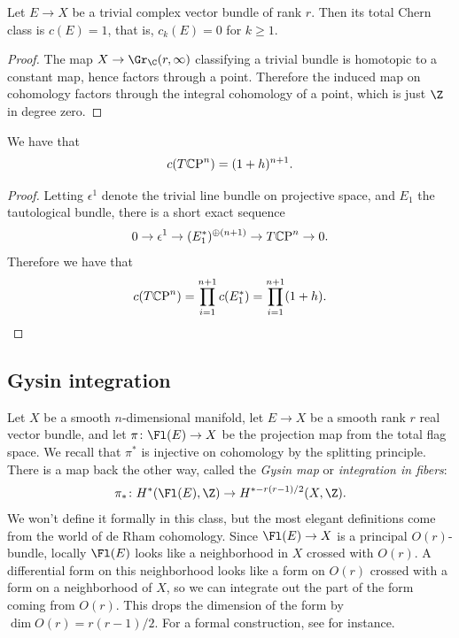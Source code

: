 \documentclass[11pt]{book}
\begin{document}
\begin{proposition}
Let $E \to X$ be a trivial complex vector bundle of rank $r$. Then its total Chern class is $c(E) =1$, that is, $c_k(E) = 0$ for $k\ge1$.
\end{proposition}
\begin{proof}
The map $X \to \Gr_\C(r,\infty)$ classifying a trivial bundle is homotopic to a constant map, hence factors through a point. Therefore the induced map on cohomology factors through the integral cohomology of a point, which is just $\Z$ in degree zero.
\end{proof}

\begin{proposition}\label{prop:chern-numbers-cpn} 
We have that
\begin{align*}
    c(T{\mathbb{C}\text{P}}^n) = (1+h)^{n+1}.
\end{align*}
\end{proposition}
\begin{proof} Letting $\epsilon^1$ denote the trivial line bundle on projective space, and $E_1$ the tautological bundle, there is a short exact sequence
\begin{align*}
    0 \to \epsilon^1 \to (E_1^\ast)^{\oplus (n+1)} \to T{\mathbb{C}\text{P}}^n \to 0.
\end{align*}
Therefore we have that
\begin{align*}
    c(T{\mathbb{C}\text{P}}^n) = \prod_{i=1}^{n+1}c(E_1^\ast) = \prod_{i=1}^{n+1}(1+h).
\end{align*}
\end{proof}

\subsection{Gysin integration}

Let $X$ be a smooth $n$-dimensional manifold, let $E\to X$ be a smooth rank $r$ real vector bundle, and let $\pi \colon \Fl(E) \to X$ be the projection map from the total flag space. We recall that $\pi^\ast$ is injective on cohomology by the splitting principle. There is a map back the other way, called the \emph{Gysin map} or \emph{integration in fibers}:
\begin{align*}
    \pi_\ast \colon H^\ast(\Fl(E),\Z) \to H^{\ast - r(r-1)/2}(X,\Z).
\end{align*}
We won't define it formally in this class, but the most elegant definitions come from the world of de Rham cohomology. Since $\Fl(E) \to X$ is a principal $O(r)$-bundle, locally $\Fl(E)$ looks like a neighborhood in $X$ crossed with $O(r)$. A differential form on this neighborhood looks like a form on $O(r)$ crossed with a form on a neighborhood of $X$, so we can integrate out the part of the form coming from $O(r)$. This drops the dimension of the form by $\dim O(r) = r(r-1)/2$. For a formal construction, see \cite[\S6]{BottTu} for instance.
\end{document}
